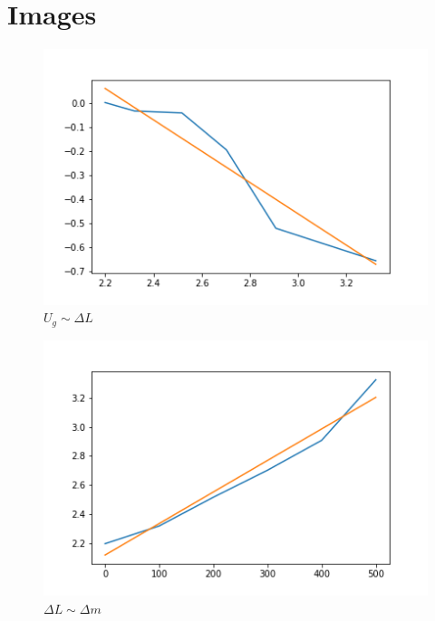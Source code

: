 \documentclass[a4paper]{article}
\begin{document}
\section*{Images}
\begin{figure}[H]
    \centering
    \includegraphics[width=0.6\linewidth]{./img/Fig.2.png}
    \caption{$U_g \sim \Delta L$}
    \label{fig:figure3}
\end{figure}
\begin{figure}[H]
    \centering
    \includegraphics[width=0.6\linewidth]{./img/Fig.3.png}
    \caption{$\Delta L \sim \Delta m$}
    \label{fig:figure4}
\end{figure}
\end{document}
